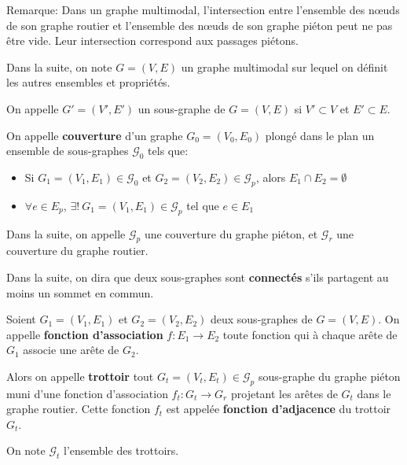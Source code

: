 \noindent
Remarque: Dans un graphe multimodal, l'intersection entre l'ensemble des nœuds de son graphe routier et l'ensemble des nœuds de son graphe piéton peut ne pas être vide. Leur intersection correspond aux passages piétons.

\newpar{}

\noindent
Dans la suite, on note $G = (V,E)$ un graphe multimodal sur lequel on définit les autres ensembles et propriétés.

\begin{definition}
    On appelle $G' = (V',E')$ un sous-graphe de $G = (V,E)$ si $V' \subset V$ et $E' \subset E$.
\end{definition}

\begin{definition}
    On appelle \textbf{couverture} d'un graphe $G_0 = (V_0,E_0)$ plongé dans le plan un ensemble de sous-graphes $\mathcal{G_0}$ tels que:
    \begin{itemize}
        \item Si $G_1=(V_1, E_1) \in \mathcal{G_0}$ et $G_2=(V_2, E_2) \in \mathcal{G}_p$, alors $E_1 \cap E_2 = \emptyset$
        \item $\forall e \in E_p$, $\exists!~G_1=(V_1, E_1) \in \mathcal{G}_p$ tel que $e \in E_1$
    \end{itemize}
\end{definition}

\noindent
Dans la suite, on appelle $\mathcal{G}_p$ une couverture du graphe piéton, et $\mathcal{G}_r$ une couverture du graphe routier.

\newpar{}

\noindent
Dans la suite, on dira que deux sous-graphes sont \textbf{connectés} s'ils partagent au moins un sommet en commun.

\begin{definition}
    Soient $G_1=(V_1, E_1)$ et $G_2=(V_2, E_2)$ deux sous-graphes de $G=(V, E)$. On appelle \textbf{fonction d'association} $f: E_1 \rightarrow E_2$ toute fonction qui à chaque arête de $G_1$ associe une arête de $G_2$.
\end{definition}

\begin{definition}
    Alors on appelle \textbf{trottoir} tout $G_t = (V_t, E_t)\in \mathcal{G}_p$ sous-graphe du graphe piéton muni d'une fonction d'association $f_t: G_t \rightarrow G_r$ projetant les arêtes de $G_t$ dans le graphe routier. Cette fonction $f_t$ est appelée \textbf{fonction d'adjacence} du trottoir $G_t$.

    On note $\mathcal{G}_t$ l'ensemble des trottoirs.
\end{definition}

